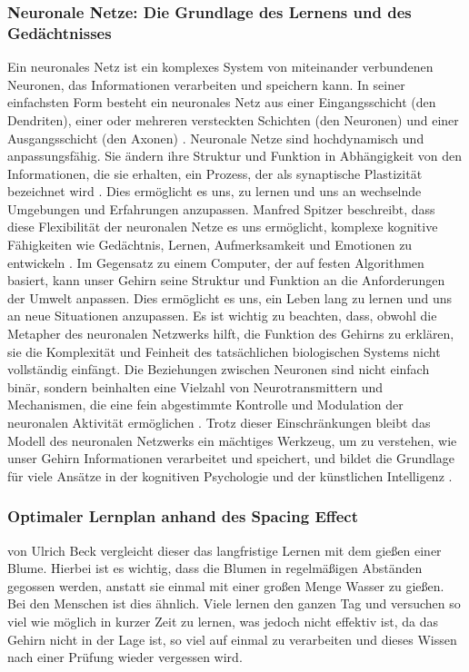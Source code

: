 \subsubsection{Neuronale Netze: Die Grundlage des Lernens und des Gedächtnisses}
Ein neuronales Netz ist ein komplexes System von miteinander verbundenen Neuronen, das Informationen verarbeiten und speichern kann. In seiner einfachsten Form besteht ein neuronales Netz aus einer Eingangsschicht (den Dendriten), einer oder mehreren versteckten Schichten (den Neuronen) und einer Ausgangsschicht (den Axonen) \cite{Bear2015}. \newline
Neuronale Netze sind hochdynamisch und anpassungsfähig. Sie ändern ihre Struktur und Funktion in Abhängigkeit von den Informationen, die sie erhalten, ein Prozess, der als synaptische Plastizität bezeichnet wird \cite{Kandel2012}. Dies ermöglicht es uns, zu lernen und uns an wechselnde Umgebungen und Erfahrungen anzupassen. \newline
Manfred Spitzer beschreibt, dass diese Flexibilität der neuronalen Netze es uns ermöglicht, komplexe kognitive Fähigkeiten wie Gedächtnis, Lernen, Aufmerksamkeit und Emotionen zu entwickeln \cite{Spitzer2002}. Im Gegensatz zu einem Computer, der auf festen Algorithmen basiert, kann unser Gehirn seine Struktur und Funktion an die Anforderungen der Umwelt anpassen. Dies ermöglicht es uns, ein Leben lang zu lernen und uns an neue Situationen anzupassen. \newline
Es ist wichtig zu beachten, dass, obwohl die Metapher des neuronalen Netzwerks hilft, die Funktion des Gehirns zu erklären, sie die Komplexität und Feinheit des tatsächlichen biologischen Systems nicht vollständig einfängt. Die Beziehungen zwischen Neuronen sind nicht einfach binär, sondern beinhalten eine Vielzahl von Neurotransmittern und Mechanismen, die eine fein abgestimmte Kontrolle und Modulation der neuronalen Aktivität ermöglichen \cite{Cooke2006}. \newline
Trotz dieser Einschränkungen bleibt das Modell des neuronalen Netzwerks ein mächtiges Werkzeug, um zu verstehen, wie unser Gehirn Informationen verarbeitet und speichert, und bildet die Grundlage für viele Ansätze in der kognitiven Psychologie und der künstlichen Intelligenz \cite{Hebb1949}. \newline
\newpage
\subsubsection{Optimaler Lernplan anhand des Spacing Effect}
 von Ulrich Beck vergleicht dieser das langfristige Lernen mit dem gießen einer Blume. Hierbei ist es wichtig, dass die Blumen in regelmäßigen Abständen gegossen werden, anstatt sie einmal mit einer großen Menge Wasser zu gießen. Bei den Menschen ist dies ähnlich. Viele lernen den ganzen Tag und versuchen so viel wie möglich in kurzer Zeit zu lernen, was jedoch nicht effektiv ist, da das Gehirn nicht in der Lage ist, so viel auf einmal zu verarbeiten und dieses Wissen nach einer Prüfung wieder vergessen wird. \cite[159]{beck_das_neue_lernen_heißt_verstehen} \newline

